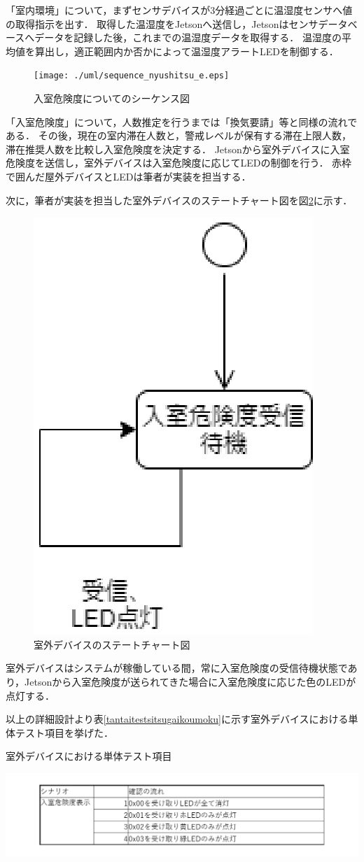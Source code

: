 「室内環境」について，まずセンサデバイスが3分経過ごとに温湿度センサへ値の取得指示を出す．
取得した温湿度をJetsonへ送信し，Jetsonはセンサデータベースへデータを記録した後，これまでの温湿度データを取得する．
温湿度の平均値を算出し，適正範囲内か否かによって温湿度アラートLEDを制御する．

\begin{figure}[htbp]
\centering
\texttt{[image: ./uml/sequence\_nyushitsu\_e.eps]}
\caption{入室危険度についてのシーケンス図}
\label{sequencenyushitsu}
\end{figure}

「入室危険度」について，人数推定を行うまでは「換気要請」等と同様の流れである．
その後，現在の室内滞在人数と，警戒レベルが保有する滞在上限人数，滞在推奨人数を比較し入室危険度を決定する．
Jetsonから室外デバイスに入室危険度を送信し，室外デバイスは入室危険度に応じてLEDの制御を行う．
赤枠で囲んだ屋外デバイスとLEDは筆者が実装を担当する．

次に，筆者が実装を担当した室外デバイスのステートチャート図を図\ref{statechartokugai}に示す．

\begin{figure}
	\centering
	\includegraphics[width=0.3\linewidth]{uml/statechart_okugai_1}
	\caption{室外デバイスのステートチャート図}
	\label{statechartokugai}
\end{figure}

室外デバイスはシステムが稼働している間，常に入室危険度の受信待機状態であり，Jetsonから入室危険度が送られてきた場合に入室危険度に応じた色のLEDが点灯する．

以上の詳細設計より表\ref{tantaitestsitsugaikoumoku}に示す室外デバイスにおける単体テスト項目を挙げた．

\begin{table}
	\centering
	\caption{室外デバイスにおける単体テスト項目}
	\label{tantaitestsitsugaikoumoku}
	\includegraphics[width=0.9\linewidth]{test/tantaitest_sitsugai_koumoku2}
\end{table}